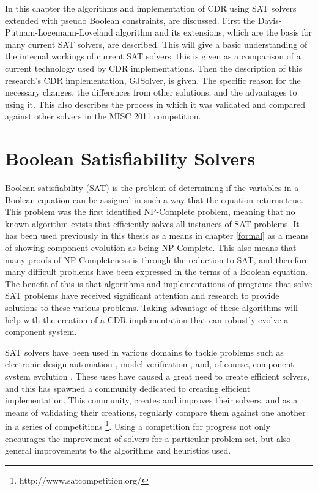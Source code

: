 In this chapter the algorithms and implementation of CDR using SAT solvers extended with pseudo Boolean constraints, are discussed.
First the Davis-Putnam-Logemann-Loveland algorithm \citep{Davis1960, davis1962machine} and its extensions, which are the basis for many current SAT solvers, are described.
This will give a basic understanding of the internal workings of current SAT solvers.
this is given as a comparison of a current technology used by CDR implementations.
Then the description of this research's CDR implementation, GJSolver, is given.
The specific reason for the necessary changes, the differences from other solutions, and the advantages to using it.
This also describes the process in which it was validated and compared against other solvers in the MISC 2011 competition.

\section{Boolean Satisfiability Solvers}
\label{impl.SAT}
Boolean satisfiability (SAT) is the problem of determining if the variables in a Boolean equation can be assigned in such a way that the equation returns true.
This problem was the first identified NP-Complete problem, meaning that no known algorithm exists that efficiently solves all instances of SAT problems.
It has been used previously in this thesis as a means in chapter \ref{formal} as a means of showing component evolution as being NP-Complete.
This also means that many proofs of NP-Completeness is through the reduction to SAT, and therefore many difficult problems have been expressed in the terms of a Boolean equation.
The benefit of this is that algorithms and implementations of programs that solve SAT problems have received significant attention and research to provide solutions to these various problems.
Taking advantage of these algorithms will help with the creation of a CDR implementation that can robustly evolve a component system.

SAT solvers have been used in various domains to tackle problems such as electronic design automation \citep{Marques-Silva2000}, 
model verification \citep{dennis2006}, and, of course, component system evolution \citep{leBerre2010}.
These uses have caused a great need to create efficient solvers, and this has spawned a community dedicated to creating efficient implementation.
This community, creates and improves their solvers, 
and as a means of validating their creations, regularly compare them against one another in a series of competitions \footnote{http://www.satcompetition.org/}.
Using a competition for progress not only encourages the improvement of solvers for a particular problem set, but also general improvements to the algorithms and heuristics used. 

